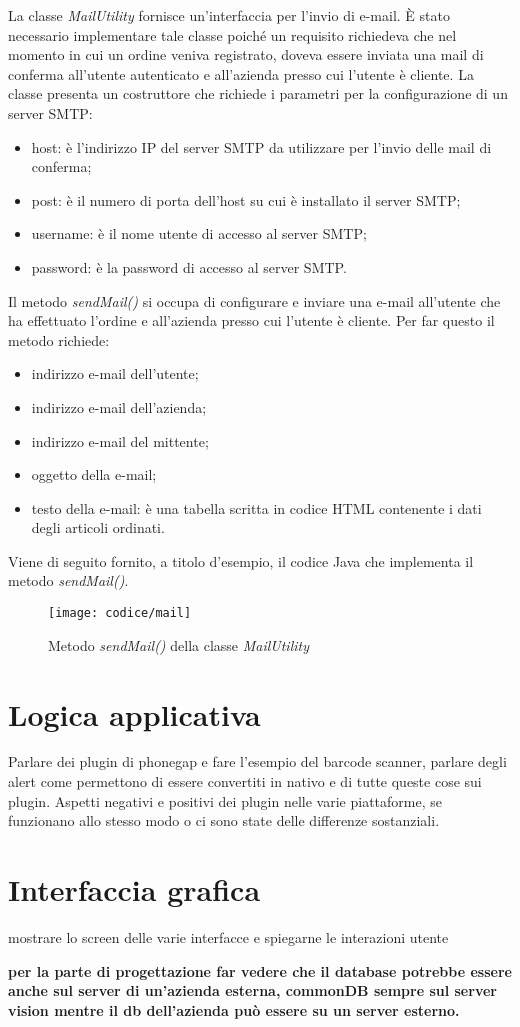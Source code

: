 La classe \textit{MailUtility} fornisce un'interfaccia per l'invio di e-mail. È stato necessario implementare tale classe poiché un requisito richiedeva che nel momento in cui un ordine veniva registrato, doveva essere inviata una mail di conferma all'utente autenticato e all'azienda presso cui l'utente è cliente. La classe presenta un costruttore che richiede i parametri per la configurazione di un server SMTP:
\begin{itemize}
	\item host: è l'indirizzo IP del server SMTP da utilizzare per l'invio delle mail di conferma;
	\item post: è il numero di porta dell'host su cui è installato il server SMTP;
	\item username: è il nome utente di accesso al server SMTP;
	\item password: è la password di accesso al server SMTP.
\end{itemize}
Il metodo \textit{sendMail()} si occupa di configurare e inviare una e-mail all'utente che ha effettuato l'ordine e all'azienda presso cui l'utente è cliente. Per far questo il metodo richiede:
\begin{itemize}
	\item indirizzo e-mail dell'utente;
	\item indirizzo e-mail dell'azienda;
	\item indirizzo e-mail del mittente;
	\item oggetto della e-mail;
	\item testo della e-mail: è una tabella scritta in codice HTML contenente i dati degli articoli ordinati.
\end{itemize}
Viene di seguito fornito, a titolo d'esempio, il codice Java che implementa il metodo \textit{sendMail()}.

\begin{figure}[!h] 
    \centering 
    \texttt{[image: codice/mail]} 
    \caption{Metodo \textit{sendMail()} della classe \textit{MailUtility}}
\end{figure}

\section{Logica applicativa}

Parlare dei plugin di phonegap e fare l'esempio del barcode scanner, parlare degli alert come permettono di essere convertiti in nativo e di tutte queste cose sui plugin. Aspetti negativi e positivi dei plugin nelle varie piattaforme, se funzionano allo stesso modo o ci sono state delle differenze sostanziali.

\section{Interfaccia grafica}

mostrare lo screen delle varie interfacce e spiegarne le interazioni utente

\textbf{per la parte di progettazione far vedere che il database potrebbe essere anche sul server di un'azienda esterna, commonDB sempre sul server vision mentre il db dell'azienda può essere su un server esterno.}
